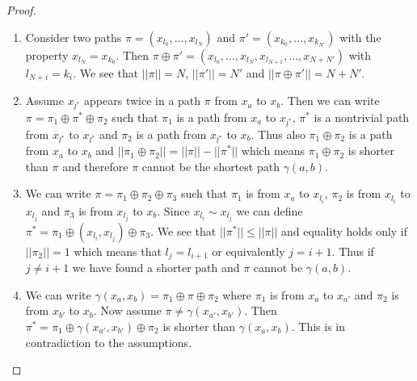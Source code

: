 \begin{proof}
	\begin{enumerate}
	\item Consider two paths $\pi = ( x_{l_0},\ldots,x_{l_N} )$ and $\pi'= (x_{k_0},\ldots,
	x_{k_{N'} } ) $ with the property $x_{l_N} = x_{k_0}$. Then 
	$\pi\oplus \pi' = (x_{l_0},\ldots,x_{l_N},x_{l_{N+1}},\ldots, x_{N+N'})$ with 
	$l_{N+i} = k_i$. We see that $||\pi||=N$, $||\pi'||=N'$ and $||\pi\oplus \pi'||=N+N'$.
	\item Assume $x_{l^*}$ appears twice in a path $\pi$ from $x_a$ to $x_b$. 
	Then we can write $\pi = \pi_1 \oplus \pi^* \oplus \pi_2$ such that $\pi_1$ is a 
	path from $x_a$ to $x_{l^*}$, $\pi^*$ is a nontrivial path from $x_{l^*}$ to $x_{l^*}$ 
	and $\pi_2$ is a path from $x_{l^*}$ to $x_b$. Thus also $\pi_1\oplus \pi_2$ is a path 
	from $x_a$ to $x_b$ and $||\pi_1\oplus\pi_2|| = ||\pi||-||\pi^*||$ which means $
	\pi_1\oplus \pi_2$ is shorter than $\pi$ and therefore $\pi$ cannot be the shortest 
	path $\gamma(a,b)$.
	\item We can write $\pi = \pi_1 \oplus \pi_2 \oplus \pi_3$ such that $\pi_1$ is from 
	$x_a$ to $x_{l_i}$, $\pi_2$ is from $x_{l_i}$ to $x_{l_j}$ and $\pi_3$ is from 
	$x_{l_j}$ to $x_b$. Since $x_{l_i}\sim x_{l_j}$ we can define 
	$\pi^* = \pi_1 \oplus (x_{l_i},x_{l_j})\oplus \pi_3 $. We see that 
	$||\pi^*||\leq ||\pi||$ and equality holds only if $||\pi_2||=1$ which means that 
	$l_j =l_{i+1}$ or equivalently $j=i+1$. Thus if $j\neq i+1$ we have found a shorter 
	path and  $\pi$ cannot be $\gamma(a,b)$.
	\item We can write $\gamma(x_a,x_b) = \pi_1 \oplus \pi \oplus \pi_2$ where $\pi_1$ is 
	from 
	$x_a$ to $x_{a'}$ and $\pi_2$ is from $x_{b'}$ to $x_b$. Now assume $\pi \neq 
	\gamma(x_{a'},x_{b'})$. Then $\pi^* = \pi_1\oplus \gamma(x_{a'},x_{b'}) \oplus \pi_2 $ 
	is shorter than $\gamma(x_a,x_b)$. This is in contradiction to the assumptions. 
 	\end{enumerate}
\end{proof}

\clearpage

